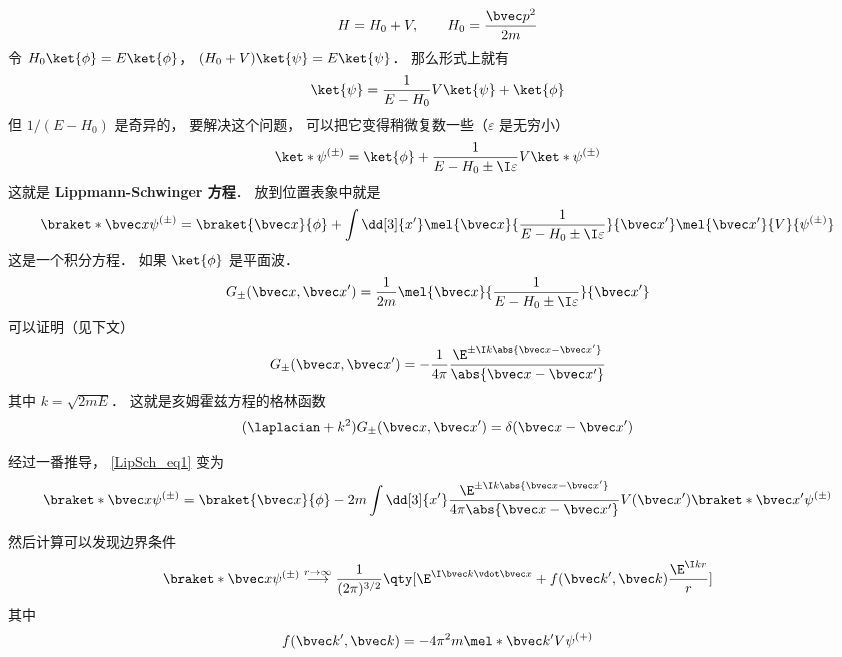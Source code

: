 

\begin{equation}
H = H_0 + V, \qquad H_0 = \frac{\bvec p^2}{2m}
\end{equation}
令 $H_0\ket{\phi} = E\ket{\phi}$， $(H_0+V)\ket{\psi}=E\ket{\psi}$． 那么形式上就有
\begin{equation}
\ket{\psi} = \frac{1}{E-H_0} V\ket{\psi} + \ket{\phi}
\end{equation}
但 $1/(E-H_0)$ 是奇异的， 要解决这个问题， 可以把它变得稍微复数一些（$\varepsilon$ 是无穷小）
\begin{equation}
\ket*{\psi^{(\pm)}} = \ket{\phi} + \frac{1}{E-H_0\pm \I\varepsilon} V \ket*{\psi^{(\pm)}}
\end{equation}
这就是 \textbf{Lippmann-Schwinger 方程}． 放到位置表象中就是
\begin{equation}\label{LipSch_eq1}
\braket*{\bvec x}{\psi^{(\pm)}} = \braket{\bvec x}{\phi} + \int \dd[3]{x'} \mel{\bvec x}{\frac{1}{E-H_0\pm \I\varepsilon}}{\bvec x'} \mel{\bvec x'}{V}{\psi^{(\pm)}}
\end{equation}
这是一个积分方程． 如果 $\ket{\phi}$ 是平面波．
\begin{equation}\label{LipSch_eq2}
G_\pm (\bvec x, \bvec x') = \frac{1}{2m} \mel{\bvec x}{\frac{1}{E-H_0\pm \I\varepsilon}}{\bvec x'}
\end{equation}
可以证明（见下文）
\begin{equation}\label{LipSch_eq3}
G_\pm (\bvec x, \bvec x') = -\frac{1}{4\pi} \frac{\E^{\pm\I k\abs{\bvec x-\bvec x'}}}{\abs{\bvec x-\bvec x'}}
\end{equation}
其中 $k = \sqrt{2mE}$． 这就是亥姆霍兹方程的格林函数
\begin{equation}
(\laplacian +k^2)G_\pm (\bvec x, \bvec x') = \delta(\bvec x-\bvec x')
\end{equation}

经过一番推导， \autoref{LipSch_eq1} 变为
\begin{equation}
\braket*{\bvec x}{\psi^{(\pm)}} = \braket{\bvec x}{\phi} - 2m\int \dd[3]{x'} \frac{\E^{\pm\I k\abs{\bvec x-\bvec x'}}}{4\pi\abs{\bvec x-\bvec x'}} V(\bvec x')\braket*{\bvec x'}{\psi^{(\pm)}}
\end{equation}

然后计算可以发现边界条件
\begin{equation}
\braket*{\bvec x}{\psi^{(\pm)}} \overset{r\to\infty}{\longrightarrow} \frac{1}{(2\pi)^{3/2}} \qty[\E^{\I \bvec k\vdot \bvec x} + f(\bvec k', \bvec k)\frac{\E^{\I kr}}{r}]
\end{equation}
其中
\begin{equation}
f(\bvec k', \bvec k) = -4\pi^2 m \mel*{\bvec k'}{V}{\psi^{(+)}}
\end{equation}

